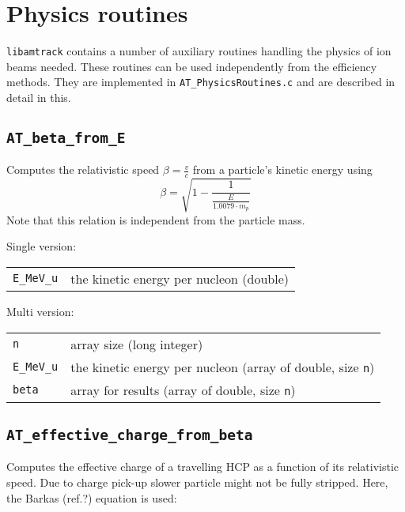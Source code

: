 
\chapter{Physics routines}

\texttt{libamtrack} contains a number of auxiliary routines handling the physics of ion beams needed. These routines can be used independently from the efficiency methods. They are implemented in \texttt{AT\_PhysicsRoutines.c} and are described in detail in this.

\section{\texttt{AT\_beta\_from\_E}}

Computes the relativistic speed $\beta=\frac{v}{c}$ from a particle's kinetic energy using
\begin{equation}
\beta = \sqrt{1 - \frac{1}{\frac{E}{1.0079\cdot m_p}}}
\end{equation}
Note that this relation is independent from the particle mass. 

Single version:\\

\begin{tabular}{l l}
\texttt{E\_MeV\_u} & the kinetic energy per nucleon (double) \\
\end{tabular}

Multi version:\\

\begin{tabular}{l l}
\texttt{n} & array size (long integer) \\
\texttt{E\_MeV\_u} & the kinetic energy per nucleon (array of double, size \texttt{n}) \\
\texttt{beta} & array for results (array of double, size \texttt{n}) \\
\end{tabular}



\section{\texttt{AT\_effective\_charge\_from\_beta}}

Computes the effective charge of a travelling HCP as a function of its relativistic speed. Due to charge pick-up slower particle might not be fully stripped. Here, the Barkas (ref.?) equation is used:

